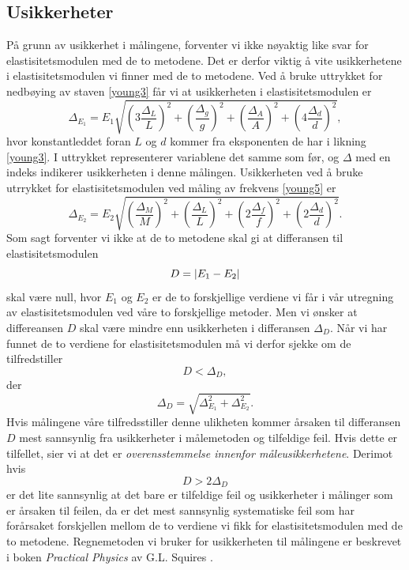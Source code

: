 \documentclass[%
 reprint,
nofootinbib,
aps,
]{revtex4-1}
\begin{document}
\subsection{Usikkerheter}
På grunn av usikkerhet i målingene, forventer vi ikke nøyaktig like svar for elastisitetsmodulen med de to metodene. Det er derfor viktig å vite usikkerhetene i elastisitetsmodulen vi finner med de to metodene. Ved å bruke uttrykket for nedbøying av staven \eqref{young3} får vi at usikkerheten i elastisitetsmodulen er
\begingroup\makeatletter\def\f@size{7.5}\check@mathfonts
\begin{equation}
  \Delta_{E_1} = E_1 \sqrt{\left(3\frac{\Delta_L}{L}\right)^2+\left(\frac{\Delta_g}{g}\right)^2+\left(\frac{\Delta_A}{A}\right)^2+\left(4\frac{\Delta_d}{d}\right)^2},\label{uncertenty1}
\end{equation}
\endgroup
hvor konstantleddet foran $L$ og $d$ kommer fra eksponenten de har i likning \eqref{young3}. I uttrykket representerer variablene det samme som før, og $\Delta$ med en indeks indikerer usikkerheten i denne målingen.
Usikkerheten ved å bruke utrrykket for elastisitetsmodulen ved måling av frekvens \eqref{young5} er
\begingroup\makeatletter\def\f@size{7.5}\check@mathfonts
\begin{equation}
  \Delta_{E_2} = E_2 \sqrt{\left(\frac{\Delta_M}{M}\right)^2+\left(\frac{\Delta_L}{L}\right)^2+\left(2\frac{\Delta_f}{f}\right)^2+\left(2\frac{\Delta_d}{d}\right)^2}. \label{uncertenty2}
\end{equation}
\endgroup
Som sagt forventer vi ikke at de to metodene skal gi at differansen til elastisitetsmodulen $$D=\abs{E_1-E_2}$$ skal være null, hvor $E_1$ og $E_2$ er de to forskjellige verdiene vi får i vår utregning av elastisitetsmodulen ved våre to forskjellige metoder. Men vi ønsker at differeansen $D$ skal være mindre enn usikkerheten i differansen $\Delta_D$. Når vi har funnet de to verdiene for elastisitetsmodulen må vi derfor sjekke om de tilfredstiller
\begin{equation}
  D < \Delta_D, \label{usikk1}
\end{equation}
der
\begin{equation}
  \Delta_D = \sqrt{\Delta_{E_1}^2 + \Delta_{E_2}^2}. \label{usikk2}
\end{equation}
Hvis målingene våre tilfredsstiller denne ulikheten kommer årsaken til differansen $D$ mest sannsynlig fra usikkerheter i målemetoden og tilfeldige feil. Hvis dette er tilfellet, sier vi at det er
\textit{overensstemmelse innenfor måleusikkerhetene}.
Derimot hvis
\begin{equation}
  D > 2\Delta_D
\end{equation}
er det lite sannsynlig at det bare er tilfeldige feil og usikkerheter i målinger som er årsaken til feilen, da er det mest sannsynlig systematiske feil som har forårsaket forskjellen mellom de to verdiene vi fikk for elastisitetsmodulen med de to metodene. Regnemetoden vi bruker for usikkerheten til målingene er beskrevet i boken \textit{Practical Physics} av G.L. Squires \cite{squires}.
\end{document}

